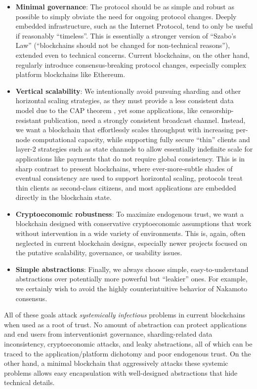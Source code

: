 \documentclass[headinclude,12pt]{scrbook}
\begin{document}
\begin{itemize}
    \item \textbf{Minimal governance}: The protocol should be as simple and robust as possible to simply obviate the need for ongoing protocol changes. Deeply embedded infrastructure, such as the Internet Protocol, tend to only be useful if reasonably ``timeless''. This is essentially a stronger version of ``Szabo's Law'' (``blockchains should not be changed for non-technical reasons''), extended even to technical concerns. Current blockchains, on the other hand, regularly introduce consensus-breaking protocol changes, especially complex platform blockchains like Ethereum.
    \item \textbf{Vertical scalability}: We intentionally avoid pursuing sharding and other horizontal scaling strategies, as they must provide a less consistent data model due to the CAP theorem \cite{brewer2012cap}, yet some applications, like censorship-resistant publication, need a strongly consistent broadcast channel. Instead, we want a blockchain that effortlessly scales throughput with increasing per-node computational capacity, while supporting fully secure ``thin'' clients and layer-2 strategies such as state channels to allow essentially indefinite scale for applications like payments that do not require global consistency. This is in sharp contrast to present blockchains, where ever-more-subtle shades of eventual consistency are used to support horizontal scaling, protocols treat thin clients as second-class citizens, and most applications are embedded directly in the blockchain state.
    \item \textbf{Cryptoeconomic robustness}: To maximize endogenous trust, we want a blockchain designed with conservative cryptoeconomic assumptions that work without intervention in a wide variety of environments. This is, again, often neglected in current blockchain designs, especially newer projects focused on the putative scalability, governance, or usability issues.
    \item \textbf{Simple abstractions}: Finally, we always choose simple, easy-to-understand abstractions over potentially more powerful but ``leakier'' ones. For example, we certainly wish to avoid the highly counterintuitive behavior of Nakamoto consensus.
\end{itemize}

All of these goals attack \emph{systemically infectious} problems in current blockchains when used as a root of trust. No amount of abstraction can protect applications and end users from interventionist governance, sharding-related data inconsistency, cryptoeconomic attacks, and leaky abstractions, all of which can be traced to the application/platform dichotomy and poor endogenous trust. On the other hand, a minimal blockchain that aggressively attacks these systemic problems allows easy encapsulation with well-designed abstractions that hide technical details.
\end{document}
